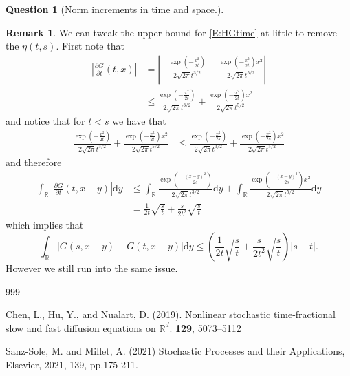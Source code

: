 \documentclass[a4paper,11pt]{article}
\numberwithin{equation}{section}
\theoremstyle{plain}
\theoremstyle{definition}
\newtheorem{question}{Question}
\newtheorem{remark}[theorem]{Remark}
\newcommand{\ud}{\ensuremath{\mathrm{d} }}
\newcommand{\R}{\mathbb{R}}
\begin{document}
\begin{question}[Norm increments in time and space.]
	\begin{remark}
		We can tweak the upper bound for \eqref{E:HGtime} at little to remove the $\eta(t,s)$. First note that 
			\begin{align*}
			\left|\frac{\partial G}{\partial t}(t, x )\right| & = \left| -\frac{\exp\left(-\frac{x^2}{2t}\right)}{2\sqrt{2 \pi} t^{3/2}} + \frac{\exp\left(-\frac{x^2}{2t}\right) x^2}{2\sqrt{2 \pi} t^{5/2} }\right| \\
			& \le \frac{\exp\left(-\frac{x^2}{2t}\right)}{2\sqrt{2 \pi} t^{3/2}}  + \frac{\exp\left(-\frac{x^2}{2t}\right) x^2}{2\sqrt{2 \pi} t^{5/2} }
			\end{align*}
		and notice that for $t < s$ we have that 
		\begin{align*}
			\frac{\exp\left(-\frac{x^2}{2t}\right)}{2\sqrt{2 \pi} t^{3/2}}  + \frac{\exp\left(-\frac{x^2}{2t}\right) x^2}{2\sqrt{2 \pi} t^{5/2} } & \le
			 \frac{\exp\left(-\frac{x^2}{2s}\right)}{2\sqrt{2 \pi} t^{3/2}}  + \frac{\exp\left(-\frac{x^2}{2s}\right) x^2}{2\sqrt{2 \pi} t^{5/2} }
		\end{align*}
		and therefore 
		\begin{align*}
			\int_{\R}\left|\frac{\partial G}{\partial t}(t, x -y)\right|\ud y  & \le 		 \int_{\R} \frac{\exp\left(-\frac{(x-y)^2}{2s}\right)}{2\sqrt{2 \pi} t^{3/2}}  \ud y+ \int_{\R} \frac{\exp\left(-\frac{(x-y)^2}{2s}\right) x^2}{2\sqrt{2 \pi} t^{5/2} } \ud y \\
			&= \frac{1}{2t}\sqrt{\frac{s}{t}} + \frac{s}{2t^2}\sqrt{\frac{s}{t}}
		\end{align*}
		which implies that 
		\[
				\int_{\R}|G(s,x-y) - G(t,x-y)| \ud y \le \left(\frac{1}{2t}\sqrt{\frac{s}{t}} + \frac{s}{2t^2}\sqrt{\frac{s}{t}}\right)|s-t|.
		\]
	However we still run into the same issue. 
	\end{remark}
		
\end{question}
	
	
	
	\begin{thebibliography}{999}
		
		Chen, L., Hu, Y., and Nualart, D. (2019).
		\newblock Nonlinear stochastic time-fractional slow and fast diffusion equations on $\R^d$.
		 \textbf{129}, 5073--5112
		
		Sanz-Sole, M. and Millet, A. (2021)
		\newblock Stochastic Processes and their Applications, Elsevier, 2021, 139, pp.175-211.
	\end{thebibliography}
	
\end{document}
